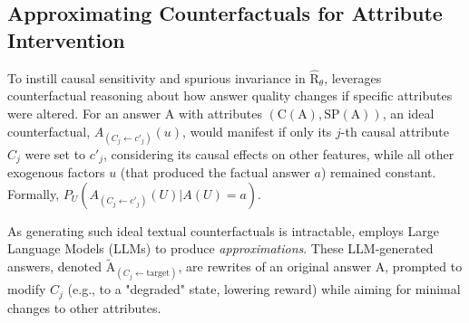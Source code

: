 


\vspace{-0.1in}
\subsection{Approximating Counterfactuals for Attribute Intervention}
\label{subsec:approximating_counterfactuals}
\vspace{-0.05in}

To instill causal sensitivity and spurious invariance in $\hat{\mathrm{R}}_\theta$, \carma{} leverages counterfactual reasoning about how answer quality changes if specific attributes were altered. For an answer $\mathrm{A}$ with attributes $(\mathrm{C}(\mathrm{A}), \mathrm{SP}(\mathrm{A}))$, an ideal counterfactual, $A_{(C_j \leftarrow c'_j)}(u)$, would manifest if only its $j$-th causal attribute $C_j$ were set to $c'_j$, considering its causal effects on other features, while all other exogenous factors $u$ (that produced the factual answer $a$) remained constant. Formally, $P_{U}(A_{(C_j \leftarrow c'_j)}(U) | A(U)=a)$.

As generating such ideal textual counterfactuals is intractable, \carma{} employs Large Language Models (LLMs) to produce \textit{approximations}. These LLM-generated answers, denoted $\tilde{\mathrm{A}}_{(C_j \leftarrow \text{target})}$, are rewrites of an original answer $\mathrm{A}$, prompted to modify $C_j$ (e.g., to a "degraded" state, lowering reward) while aiming for minimal changes to other attributes.



